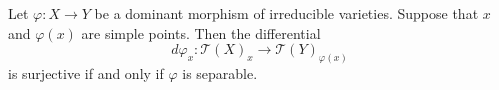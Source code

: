 Let $\varphi: X \rightarrow Y$ be a dominant morphism of irreducible varieties. Suppose that $x$ and $\varphi(x)$ are simple points. Then the differential
$$d\varphi_x: \mathcal{T}(X)_x \rightarrow \mathcal{T}(Y)_{\varphi(x)}$$
is surjective if and only if $\varphi$ is separable.
